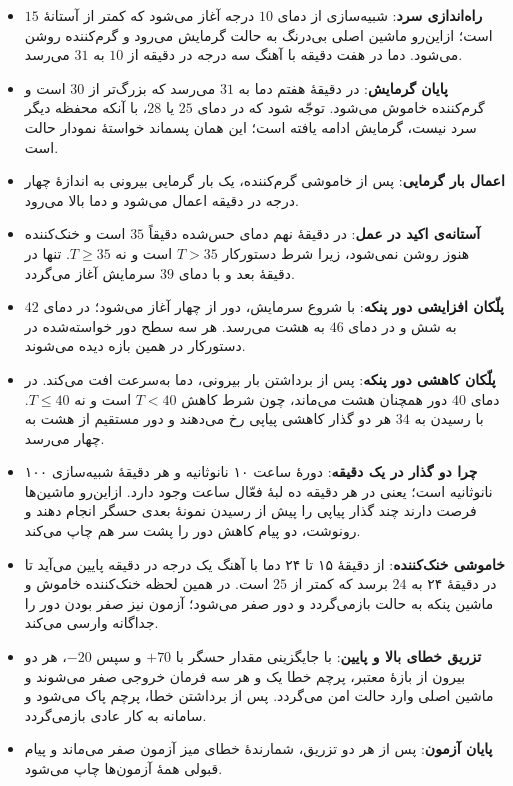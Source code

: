 \documentclass[12pt,a4paper]{article}
\begin{document}
	\begin{itemize}
		\item \textbf{راه‌اندازی سرد}: شبیه‌سازی از دمای \(10\) درجه آغاز می‌شود که کمتر از آستانهٔ \(15\) است؛ ازاین‌رو ماشین اصلی بی‌درنگ به حالت گرمایش می‌رود و گرم‌کننده روشن می‌شود. دما در هفت دقیقه با آهنگ سه درجه در دقیقه از \(10\) به \(31\) می‌رسد.
		\item \textbf{پایان گرمایش}: در دقیقهٔ هفتم دما به \(31\) می‌رسد که بزرگ‌تر از \(30\) است و گرم‌کننده خاموش می‌شود. توجّه شود که در دمای \(25\) یا \(28\)، با آنکه محفظه دیگر سرد نیست، گرمایش ادامه یافته است؛ این همان پسماند خواستهٔ نمودار حالت است.
		\item \textbf{اعمال بار گرمایی}: پس از خاموشی گرم‌کننده، یک بار گرمایی بیرونی به اندازهٔ چهار درجه در دقیقه اعمال می‌شود و دما بالا می‌رود.
		\item \textbf{آستانه‌ی اکید در عمل}: در دقیقهٔ نهم دمای حس‌شده دقیقاً \(35\) است و خنک‌کننده هنوز روشن نمی‌شود، زیرا شرط دستورکار \(T>35\) است و نه \(T\geq35\). تنها در دقیقهٔ بعد و با دمای \(39\) سرمایش آغاز می‌گردد.
		\item \textbf{پلّکان افزایشی دور پنکه}: با شروع سرمایش، دور از چهار آغاز می‌شود؛ در دمای \(42\) به شش و در دمای \(46\) به هشت می‌رسد. هر سه سطح دور خواسته‌شده در دستورکار در همین بازه دیده می‌شوند.
		\item \textbf{پلّکان کاهشی دور پنکه}: پس از برداشتن بار بیرونی، دما به‌سرعت افت می‌کند. در دمای \(40\) دور همچنان هشت می‌ماند، چون شرط کاهش \(T<40\) است و نه \(T\leq40\). با رسیدن به \(34\) هر دو گذار کاهشی پیاپی رخ می‌دهند و دور مستقیم از هشت به چهار می‌رسد.
		\item \textbf{چرا دو گذار در یک دقیقه}: دورهٔ ساعت ۱۰ نانوثانیه و هر دقیقهٔ شبیه‌سازی ۱۰۰ نانوثانیه است؛ یعنی در هر دقیقه ده لبهٔ فعّال ساعت وجود دارد. ازاین‌رو ماشین‌ها فرصت دارند چند گذار پیاپی را پیش از رسیدن نمونهٔ بعدی حسگر انجام دهند و رونوشت، دو پیام کاهش دور را پشت سر هم چاپ می‌کند.
		\item \textbf{خاموشی خنک‌کننده}: از دقیقهٔ ۱۵ تا ۲۴ دما با آهنگ یک درجه در دقیقه پایین می‌آید تا در دقیقهٔ ۲۴ به \(24\) برسد که کمتر از \(25\) است. در همین لحظه خنک‌کننده خاموش و ماشین پنکه به حالت  بازمی‌گردد و دور صفر می‌شود؛ آزمون نیز صفر بودن دور را جداگانه وارسی می‌کند.
		\item \textbf{تزریق خطای بالا و پایین}: با جایگزینی مقدار حسگر با \(+70\) و سپس \(-20\)، هر دو بیرون از بازهٔ معتبر، پرچم خطا یک و هر سه فرمان خروجی صفر می‌شوند و ماشین اصلی وارد حالت امن می‌گردد. پس از برداشتن خطا، پرچم پاک می‌شود و سامانه به کار عادی بازمی‌گردد.
		\item \textbf{پایان آزمون}: پس از هر دو تزریق، شمارندهٔ خطای میز آزمون صفر می‌ماند و پیام قبولی همهٔ آزمون‌ها چاپ می‌شود.
	\end{itemize}
\end{document}
